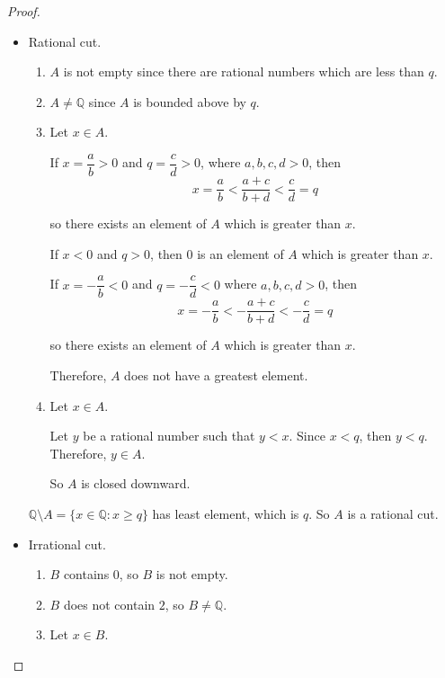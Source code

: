 \begin{proof}
    \begin{itemize}[topsep=0pt]
        \item Rational cut.
              \begin{enumerate}[label={(\roman*)},topsep=0pt]
                  \item $A$ is not empty since there are rational numbers which are less than $q$.
                  \item $A\ne\mathbb{Q}$ since $A$ is bounded above by $q$.
                  \item Let $x\in A$.

                        If $x = \dfrac{a}{b} > 0$ and $q = \dfrac{c}{d} > 0$, where $a, b, c, d > 0$, then
                        \[
                            x = \frac{a}{b} < \frac{a + c}{b + d} < \frac{c}{d} = q
                        \]

                        so there exists an element of $A$ which is greater than $x$.

                        If $x < 0$ and $q > 0$, then $0$ is an element of $A$ which is greater than $x$.

                        If $x = -\dfrac{a}{b} < 0$ and $q = -\dfrac{c}{d} < 0$ where $a, b, c, d > 0$, then
                        \[
                            x = -\frac{a}{b} < -\frac{a + c}{b + d} < -\frac{c}{d} = q
                        \]

                        so there exists an element of $A$ which is greater than $x$.

                        Therefore, $A$ does not have a greatest element.
                  \item Let $x\in A$.

                        Let $y$ be a rational number such that $y < x$. Since $x < q$, then $y < q$. Therefore, $y\in A$.

                        So $A$ is closed downward.
              \end{enumerate}

              $\mathbb{Q}\setminus A = \{ x\in\mathbb{Q}: x\ge q \}$ has least element, which is $q$. So $A$ is a rational cut.
        \item Irrational cut.
              \begin{enumerate}[label={(\roman*)},topsep=0pt]
                  \item $B$ contains $0$, so $B$ is not empty.
                  \item $B$ does not contain $2$, so $B\ne\mathbb{Q}$.
                  \item Let $x\in B$.


\end{enumerate}
\end{itemize}
\end{proof}
